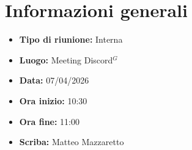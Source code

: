 \section{Informazioni generali}

\begin{itemize}
    \item \textbf{Tipo di riunione:} Interna
    \item \textbf{Luogo:} Meeting Discord$^G$
    \item \textbf{Data:} 07/04/2026
    \item \textbf{Ora inizio:} 10:30
    \item \textbf{Ora fine:} 11:00
    \item \textbf{Scriba:} Matteo Mazzaretto
\end{itemize}